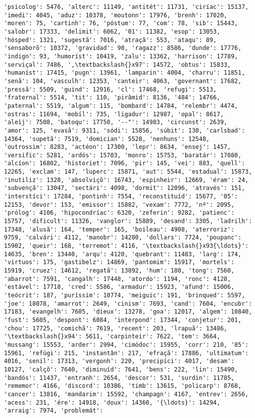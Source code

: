 \begin{Verbatim}[commandchars=\\\{\}]
'psicolog': 5476, 'alterc': 11149, 'antitét': 11731, 'ciríac': 15137, 'imedi': 4045, 'aduz': 10378, 'moutonn': 17976, 'brenh': 17020, 'moren': 75, 'cartinh': 76, 'póstum': 77, 'com': 78, 'sib': 15443, 'salobr': 17333, 'delimit': 6062, '01': 11382, 'esop': 13053, 'hósped': 1321, 'sugestã': 7016, 'atraçã': 553, 'ataqu': 89, 'sensaborõ': 10372, 'gravidad': 90, 'ragazz': 8586, 'dunde': 17776, 'indign': 93, 'humoríst': 10419, 'zalu': 13362, 'harrison': 17789, 'serviçal': 7486, ',\textbackslash{}x97': 14572, 'obtus': 15833, 'humaníst': 17415, 'pugn': 13961, 'lamparin': 4004, 'charru': 11851, 'senã': 104, 'vasculh': 12353, 'canteir': 4063, 'governant': 17682, 'pressã': 5509, 'guind': 12916, 'cl': 17468, 'refugi': 5513, 'fraternal': 5514, 'tit': 110, 'pirâmid': 8136, '484': 14766, 'paternal': 5519, 'algum': 115, 'bombard': 14784, 'relembr': 4474, 'ostras': 11694, 'mobíl': 735, 'ligadur': 12987, 'opal': 8617, 'aleij': 7508, 'batoqu': 17750, '--"': 14983, 'circunst': 2639, 'amor': 125, 'evasã': 9311, 'sódi': 15856, 'súbit': 130, 'carlsbad': 14364, 'supetã': 7519, 'domician': 5528, 'nenhuns': 12548, 'outrossim': 8283, 'actéon': 17300, 'lepr': 8634, 'ensej': 1457, 'versific': 5281, 'ardós': 15703, 'monro': 15753, 'baratár': 17080, 'alcíon': 16802, 'historiet': 7096, 'pir': 145, 'vei': 883, 'quell': 12265, 'exclam': 147, 'luperc': 15871, 'aut': 5544, 'estadual': 15873, 'inutiliz': 1328, 'absolviçõ': 16743, 'espinheir': 12669, 'éram': 24, 'subvençã': 13047, 'sectári': 4098, 'dormit': 12096, 'através': 151, 'interstíci': 17284, 'pontinh': 7554, 'reconstituíd': 15677, '05': 12153, 'devor': 153, 'emissor': 15882, 'vexam': 7772, 'nº': 2095, 'prólog': 4106, 'hipocondríac': 6320, 'zeferin': 9282, 'patienc': 15757, 'dificult': 11326, 'vanglor': 15889, 'desand': 3305, 'ladrilh': 17348, 'alusã': 164, 'temper': 165, 'boileau': 4908, 'aterroriz': 9759, 'calvári': 4112, 'manobr': 14280, 'dollars': 7724, 'poupanc': 15902, 'queir': 168, 'terremot': 4116, '\textbackslash{}x93{\ldots}': 14635, 'bren': 13440, 'arqu': 4120, 'quebrant': 11483, 'larg': 174, 'virtuos': 175, 'gastibelz': 14869, 'pantomim': 15917, 'mortels': 15919, 'cruez': 14612, 'regatã': 13892, 'hum': 180, 'tong': 7560, 'abarrot': 7591, 'cangalh': 17448, 'atordo': 1194, 'ronc': 4128, 'estável': 17718, 'cred': 5586, 'armadur': 15923, 'afund': 15006, 'teócrit': 187, 'puríssim': 10774, 'meiguic': 191, 'brinqued': 5597, 'joe': 18078, 'amarrot': 2649, 'cinism': 7693, 'cand': 7604, 'encubr': 17183, 'evangelh': 7605, 'dieux': 13278, 'goa': 12017, 'algem': 10840, 'fust': 5605, 'despont': 6084, 'interpond': 17344, 'conjetur': 201, 'chou': 17725, 'comichã': 7619, 'recent': 203, 'lrapuã': 13486, '\textbackslash{}x94': 5611, 'carpinteir': 7622, 'tem': 3664, 'mussang': 15553, 'arder': 2994, 'cimódoc': 15955, 'corr': 210, '85': 15961, 'refúgi': 215, 'instantân': 217, 'efraçã': 17886, 'ultimatum': 4016, 'senil': 17313, 'vergonh': 220, 'precipíci': 4017, 'desam': 10127, 'calçõ': 7640, 'diminuíd': 7641, 'bens': 222, 'lin': 15490, 'bandós': 11437, 'entranh': 2654, 'descor': 531, 'surdin': 11785, 'rememor': 4166, 'discord': 10386, 'timb': 13615, 'policarp': 8768, 'cancer': 13816, 'mandarim': 15592, 'champagn': 4167, 'entrev': 2656, 'acess': 231, 'ére': 14918, 'doux': 14360, '{\ldots}': 14294, 'arraig': 7974, 'problemát': 
\end{Verbatim}
